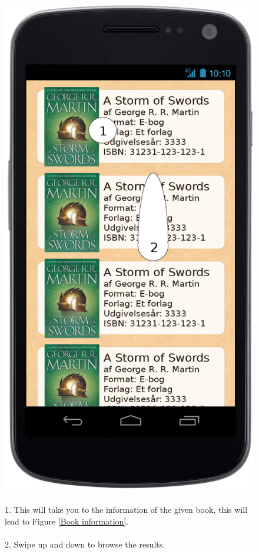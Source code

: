 \message{ !name(Rapport.tex)}\documentclass[12pt]{article}
\begin{document}
\begin{figure}
\includegraphics[scale=0.7]{gnexresultater.png}
\caption{
\\
1. This will take you to the information of the given book, this will lead to Figure \ref{Book information}.\\\\
2. Swipe up and down to browse the results.
}
\label{Results}
\end{figure}
\end{document}

